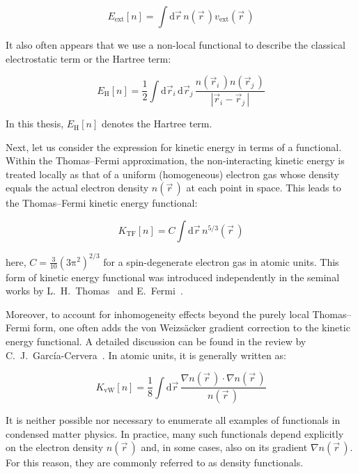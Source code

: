 \begin{equation}
    E_\mathrm{ext}[n]=\int\mathrm{d}\vec{r}\,n(\vec{r}\,)v_\mathrm{ext}(\vec{r}\,)
\label{functional_energy_potential}
\end{equation}

It also often appears that we use a non-local functional to describe the classical electrostatic term or the Hartree term:

\begin{equation}
    E_\mathrm{H}[n]=\frac{1}{2}\int\mathrm{d}\vec{r}_i\,\mathrm{d}\vec{r}_j\,\frac{n(\vec{r}_i\,)n(\vec{r}_j\,)}{|\vec{r}_i-\vec{r}_j\,|}
\label{hartree_functional}
\end{equation}

In this thesis, $E_\mathrm{H}[n]$ denotes the Hartree term.

Next, let us consider the expression for kinetic energy in terms of a functional. Within the Thomas--Fermi approximation,
the non-interacting kinetic energy is treated locally as that of a uniform (homogeneous) electron gas whose density equals the actual electron density $n(\vec{r}\,)$ at each point in space.
This leads to the Thomas--Fermi kinetic energy functional:

\begin{equation}
    K_\mathrm{TF}[n]=C\int\mathrm{d}\vec{r}\,n^{5/3}(\vec{r}\,)
\label{tf_functional}
\end{equation}

here, $C=\frac{3}{10}(3\mathrm{\pi}^2)^{2/3}$ for a spin-degenerate electron gas in atomic units.
This form of kinetic energy functional was introduced independently in the seminal works by L.~H.~Thomas~\cite{thomas1927calculation} and E.~Fermi~\cite{fermi1927metodo}.

Moreover, to account for inhomogeneity effects beyond the purely local Thomas--Fermi form, one often adds the von Weizsäcker gradient correction to the kinetic energy functional.
A detailed discussion can be found in the review by C.~J.~García-Cervera~\cite{garcia2007efficient}.
In atomic units, it is generally written as:

\begin{equation}
    K_\mathrm{vW}[n] = \frac{1}{8}\int \mathrm{d}\vec{r}\,\frac{\nabla n(\vec{r}\,)\cdot\nabla n(\vec{r}\,)}{n(\vec{r}\,)}
\label{vw_functional}
\end{equation}

It is neither possible nor necessary to enumerate all examples of functionals in condensed matter physics.
In practice, many such functionals depend explicitly on the electron density $n(\vec{r}\,)$ and, in some cases, also on its gradient $\nabla n(\vec{r}\,)$.
For this reason, they are commonly referred to as density functionals.

